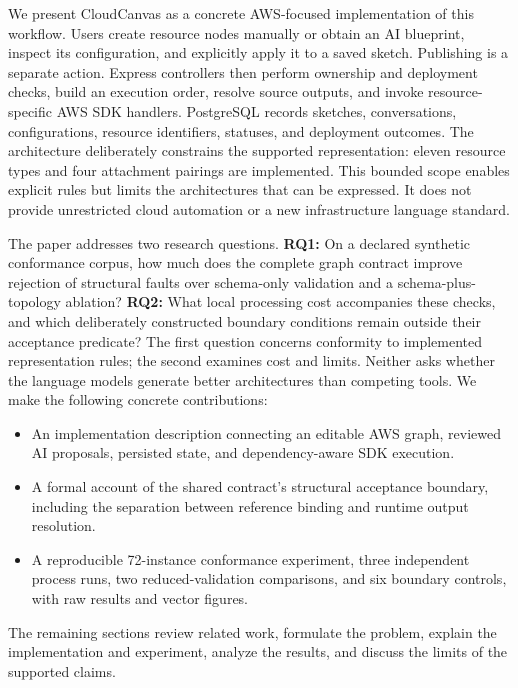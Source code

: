We present CloudCanvas as a concrete AWS-focused implementation of this workflow. Users create resource nodes manually or obtain an AI blueprint, inspect its configuration, and explicitly apply it to a saved sketch. Publishing is a separate action. Express controllers then perform ownership and deployment checks, build an execution order, resolve source outputs, and invoke resource-specific AWS SDK handlers. PostgreSQL records sketches, conversations, configurations, resource identifiers, statuses, and deployment outcomes. The architecture deliberately constrains the supported representation: eleven resource types and four attachment pairings are implemented. This bounded scope enables explicit rules but limits the architectures that can be expressed. It does not provide unrestricted cloud automation or a new infrastructure language standard.

The paper addresses two research questions. \textbf{RQ1:} On a declared synthetic conformance corpus, how much does the complete graph contract improve rejection of structural faults over schema-only validation and a schema-plus-topology ablation? \textbf{RQ2:} What local processing cost accompanies these checks, and which deliberately constructed boundary conditions remain outside their acceptance predicate? The first question concerns conformity to implemented representation rules; the second examines cost and limits. Neither asks whether the language models generate better architectures than competing tools. We make the following concrete contributions:
\begin{itemize}
\item An implementation description connecting an editable AWS graph, reviewed AI proposals, persisted state, and dependency-aware SDK execution.
\item A formal account of the shared contract's structural acceptance boundary, including the separation between reference binding and runtime output resolution.
\item A reproducible 72-instance conformance experiment, three independent process runs, two reduced-validation comparisons, and six boundary controls, with raw results and vector figures.
\end{itemize}
The remaining sections review related work, formulate the problem, explain the implementation and experiment, analyze the results, and discuss the limits of the supported claims.
